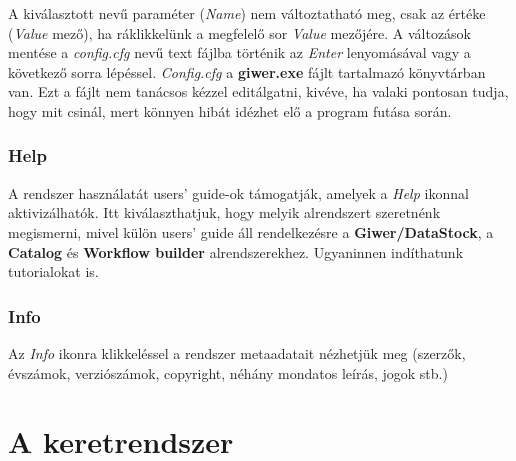 \documentclass[a4paper,12pt]{article}
\begin{document}
A kiválasztott nevű paraméter (\textit{Name}) nem változtatható meg, csak az értéke (\textit{Value} mező), ha ráklikkelünk a megfelelő sor \textit{Value} mezőjére. A változások mentése a \textit{config.cfg} nevű text fájlba történik az \textit{Enter} lenyomásával vagy a következő sorra lépéssel. \textit{Config.cfg} a \textbf{giwer.exe} fájlt tartalmazó könyvtárban van. Ezt a fájlt nem tanácsos kézzel editálgatni, kivéve, ha valaki pontosan tudja, hogy mit csinál, mert könnyen hibát idézhet elő a program futása során.



\subsubsection{Help}

A rendszer használatát users' guide-ok támogatják, amelyek a \textit{Help} ikonnal aktivizálhatók. Itt kiválaszthatjuk, hogy melyik alrendszert szeretnénk megismerni, mivel külön users' guide áll rendelkezésre a \textbf{Giwer/DataStock}, a \textbf{Catalog} és \textbf{Workflow builder} alrendszerekhez. Ugyaninnen indíthatunk tutorialokat is.


\subsubsection{Info}

Az \textit{Info} ikonra klikkeléssel a rendszer metaadatait nézhetjük meg (szerzők, évszámok, verziószámok, copyright, néhány mondatos leírás, jogok stb.)


\section{A keretrendszer}
\end{document}
